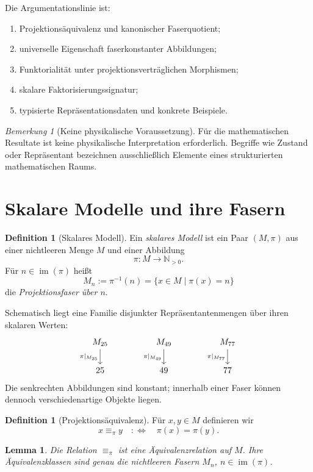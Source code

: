\documentclass[11pt,a4paper,reqno]{amsart}
\newtheorem{lemma}[theorem]{Lemma}
\theoremstyle{definition}
\newtheorem{definition}[theorem]{Definition}
\theoremstyle{remark}
\newtheorem{remark}[theorem]{Bemerkung}
\newcommand{\Npos}{\mathbb{N}_{>0}}
\newcommand{\im}{\operatorname{im}}
\newcommand{\eqpi}{\mathrel{\equiv_{\pi}}}
\begin{document}
Die Argumentationslinie ist:
\begin{enumerate}[label=\textup{(\roman*)}]
  \item Projektionsäquivalenz und kanonischer Faserquotient;
  \item universelle Eigenschaft faserkonstanter Abbildungen;
  \item Funktorialität unter projektionsverträglichen Morphismen;
  \item skalare Faktorisierungssignatur;
  \item typisierte Repräsentationsdaten und konkrete Beispiele.
\end{enumerate}

\begin{remark}[Keine physikalische Voraussetzung]
Für die mathematischen Resultate ist keine physikalische Interpretation erforderlich. Begriffe wie Zustand oder Repräsentant bezeichnen ausschließlich Elemente eines strukturierten mathematischen Raums.
\end{remark}

\section{Skalare Modelle und ihre Fasern}

\begin{definition}[Skalares Modell]
Ein \emph{skalares Modell} ist ein Paar $(M,\pi)$ aus einer nichtleeren Menge $M$ und einer Abbildung
\[
  \pi\colon M\longrightarrow\Npos.
\]
Für $n\in\im(\pi)$ heißt
\[
  M_n:=\pi^{-1}(n)=\{x\in M\mid \pi(x)=n\}
\]
die \emph{Projektionsfaser über $n$}.
\end{definition}

Schematisch liegt eine Familie disjunkter Repräsentantenmengen über ihren skalaren Werten:
\[
\begin{tikzcd}[column sep=huge]
M_{25} \arrow[d,"\pi|_{M_{25}}"'] &
M_{49} \arrow[d,"\pi|_{M_{49}}"'] &
M_{77} \arrow[d,"\pi|_{M_{77}}"']\\
25 & 49 & 77
\end{tikzcd}
\]
Die senkrechten Abbildungen sind konstant; innerhalb einer Faser können dennoch verschiedenartige Objekte liegen.

\begin{definition}[Projektionsäquivalenz]
Für $x,y\in M$ definieren wir
\[
  x\eqpi y
  \quad:\Longleftrightarrow\quad
  \pi(x)=\pi(y).
\]
\end{definition}

\begin{lemma}
Die Relation $\equiv_\pi$ ist eine Äquivalenzrelation auf $M$. Ihre Äquivalenzklassen sind genau die nichtleeren Fasern $M_n$, $n\in\im(\pi)$.
\end{lemma}
\end{document}
